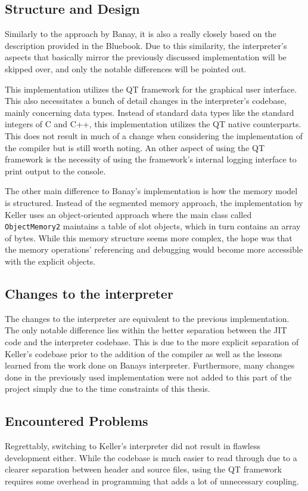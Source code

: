 \subsection{Structure and Design}
Similarly to the approach by Banay, it is also a really closely based on the description provided in the Bluebook. 
Due to this similarity, the interpreter's aspects that basically mirror the previously discussed implementation will be skipped over, and only the notable differences will be pointed out. 

This implementation utilizes the QT framework for the graphical user interface. This also necessitates a bunch of detail changes in the interpreter's codebase, mainly concerning data types. Instead of standard data types like the standard integers of C and C++, this implementation utilizes the QT native counterparts. This does not result in much of a change when considering the implementation of the \jit{} compiler but is still worth noting. 
An other aspect of using the QT framework is the necessity of using the framework's internal logging interface to print output to the console. 

The other main difference to Banay's implementation is how the memory model is structured. Instead of the segmented memory approach, the implementation by Keller uses an object-oriented approach where the main class called \texttt{ObjectMemory2} maintains a table of slot objects, which in turn contains an array of bytes. 
While this memory structure seems more complex, the hope was that the memory operations' referencing and debugging would become more accessible with the explicit objects.

\subsection{Changes to the interpreter}
The changes to the interpreter are equivalent to the previous implementation. The only notable difference lies within the better separation between the JIT code and the interpreter codebase. This is due to the more explicit separation of Keller's codebase prior to the addition of the \jit{} compiler as well as the lessons learned from the work done on Banays interpreter. Furthermore, many changes done in the previously used implementation were not added to this part of the project simply due to the time constraints of this thesis.

\subsection{Encountered Problems}
Regrettably, switching to Keller's interpreter did not result in flawless development either. While the codebase is much easier to read through due to a clearer separation between header and source files, using the QT framework requires some overhead in programming that adds a lot of unnecessary coupling. 

